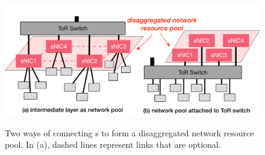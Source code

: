 {
\begin{figure}
\begin{center}
\centerline{\includegraphics[width=\textwidth]{snic/Figures/fig-topology.pdf}}
{
Two ways of connecting \snic{}s to form a disaggregated network resource pool. In (a), dashed lines represent links that are optional.
}
\end{center}
\end{figure}
}